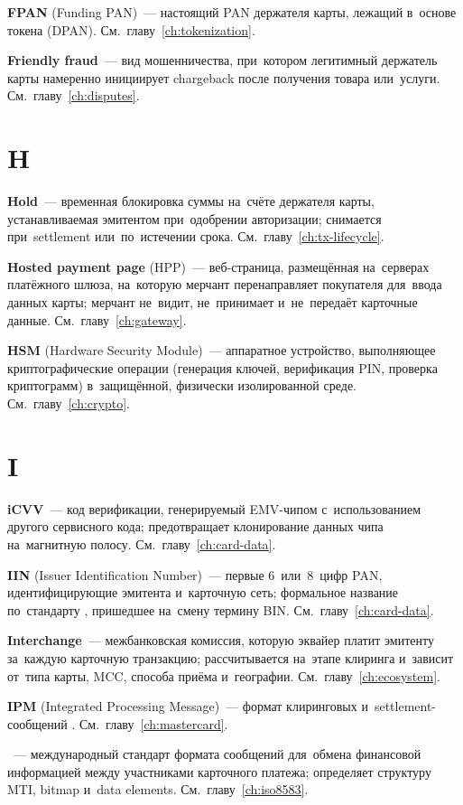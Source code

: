 \textbf{FPAN} (Funding PAN)~--- настоящий PAN держателя карты,
лежащий в~основе токена
(DPAN). См.~главу~\ref{ch:tokenization}.

\textbf{Friendly fraud}~--- вид мошенничества, при~котором
легитимный держатель карты намеренно инициирует chargeback после
получения товара
или~услуги. См.~главу~\ref{ch:disputes}.


\section*{H}

\textbf{Hold}~--- временная блокировка суммы на~счёте держателя
карты, устанавливаемая эмитентом при~одобрении авторизации;
снимается при~settlement или~по~истечении
срока. См.~главу~\ref{ch:tx-lifecycle}.

\textbf{Hosted payment page} (HPP)~--- веб-страница,
размещённая на~серверах платёжного шлюза, на~которую мерчант
перенаправляет покупателя для~ввода данных карты; мерчант
не~видит, не~принимает и~не~передаёт карточные
данные. См.~главу~\ref{ch:gateway}.

\textbf{HSM} (Hardware Security Module)~--- аппаратное
устройство, выполняющее криптографические операции (генерация
ключей, верификация PIN, проверка криптограмм) в~защищённой,
физически изолированной среде. См.~главу~\ref{ch:crypto}.


\section*{I}

\textbf{iCVV}~--- код верификации, генерируемый EMV-чипом
с~использованием другого сервисного кода; предотвращает
клонирование данных чипа на~магнитную
полосу. См.~главу~\ref{ch:card-data}.

\textbf{IIN} (Issuer Identification Number)~--- первые
6~или~8~цифр PAN, идентифицирующие эмитента и~карточную сеть;
формальное название по~стандарту , пришедшее на~смену
термину BIN. См.~главу~\ref{ch:card-data}.

\textbf{Interchange}~--- межбанковская комиссия, которую
эквайер платит эмитенту за~каждую карточную транзакцию;
рассчитывается на~этапе клиринга и~зависит от~типа карты, MCC,
способа приёма и~географии. См.~главу~\ref{ch:ecosystem}.

\textbf{IPM} (Integrated Processing Message)~--- формат
клиринговых и~settlement-сообщений
. См.~главу~\ref{ch:mastercard}.

\textbf{}~--- международный стандарт формата сообщений
для~обмена финансовой информацией между участниками карточного
платежа; определяет структуру MTI, bitmap и~data
elements. См.~главу~\ref{ch:iso8583}.

